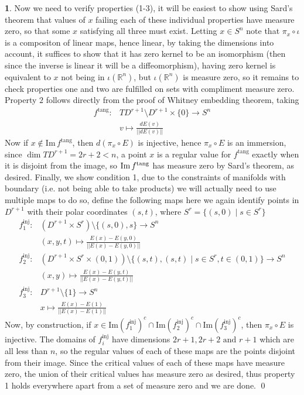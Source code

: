 \documentclass[10.5pt]{article}
\theoremstyle{definition}
\newtheorem{pb}{}
\newcommand{\set}[1]{\{#1\}}
\newcommand{\norm}[1]{\lvert\lvert#1\rvert\rvert}
\newcommand{\tand}{\text{ and }}
\begin{document}
\begin{pb}
        Now we need to verify properties (1-3), it will be easiest to show using Sard's theorem that values of \(x\) failing each of these individual properties have measure zero, so that some \(x\) satisfying all three must exist. Letting \(x \in S^n\) note that \(\pi_x\circ \iota\) is a compositon of linear maps, hence linear, by taking the dimensions into account, it suffices to show that it has zero kernel to be an isomorphism (then since the inverse is linear it will be a diffeomorphism), having zero kernel is equivalent to \(x\) not being in \(\iota(\mathbb{R}^n)\), but \(\iota(\mathbb{R}^n)\) is measure zero, so it remains to check properties one and two are fulfilled on sets with compliment measure zero. Property \(2\) follows directly from the proof of Whitney embedding theorem, taking \begin{align*}
            f^{\text{tang}} : &TD^{r+1} \setminus D^{r+1} \times \set{0} \to S^n \\
            &v \mapsto \frac{dE(v)}{\norm{dE(v)}}
        \end{align*}
        Now if \(x \not \in \text{Im}\,f^{\text{tang}}\), then \(d(\pi_x\circ E)\) is injective, hence \(\pi_x \circ E\) is an immersion, since \(\dim TD^{r+1} = 2r+2 < n\), a point \(x\) is a regular value for \(f^{\text{tang}}\) exactly when it is disjoint from the image, so \(\text{Im}\,f^\text{\text{tang}}\) has measure zero by Sard's theorem, as desired. Finally, we show condition 1, due to the constraints of manifolds with boundary (i.e. not being able to take products) we will actually need to use multiple maps to do so, define the following maps here we again identify points in \(D^{r+1}\) with their polar coordinates \((s,t)\), where \(S^r = \set{(s,0) \mid s \in S^r}\)
        \begin{align*}
            f^\text{inj}_1: &(D^{r+1} \times S^r) \setminus \set{(s,0),s} \to S^n  \\
            &(x,y,t) \mapsto \frac{E(x) - E(y,0)}{\norm{E(x) - E(y,0)}} \\
            f^{\text{inj}}_2: &(D^{r+1} \times S^r \times (0,1)) \setminus \set{(s,t),(s,t) \mid s \in S^r, t\in (0,1)} \to S^n  \\
            &(x,y) \mapsto \frac{E(x) - E(y,t)}{\norm{E(x) - E(y,t)}}\\
            f^\text{inj}_3: &D^{r+1} \setminus \set{1} \to S^n  \\
            &x \mapsto \frac{E(x) - E(1)}{\norm{E(x) - E(1)}}
        \end{align*}
        Now, by construction, if \(x \in \text{Im}(f_1^\text{inj})^c \cap \text{Im}(f_2^\text{inj})^c \cap \text{Im}(f_3^\text{inj})^c\), then \(\pi_x\circ E\) is injective. The domains of \(f_i^\text{inj}\) have dimensions \(2r+1,2r+2 \tand r+1\) which are all less than \(n\), so the regular values of each of these maps are the points disjoint from their image. Since the critical values of each of these maps have measure zero, the union of their critical values has measure zero as desired, thus property 1 holds everywhere apart from a set of measure zero and we are done. \qed
    \end{pb}
\end{document}
